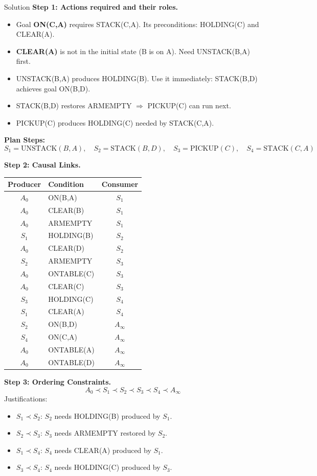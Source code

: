 \documentclass[12pt,a4paper]{article}
\begin{document}
\begin{solbox}{Solution}
\textbf{Step 1: Actions required and their roles.}

\begin{itemize}[noitemsep]
  \item Goal \textbf{ON(C,A)} requires STACK(C,A). Its preconditions: HOLDING(C) and CLEAR(A).
  \item \textbf{CLEAR(A)} is not in the initial state (B is on A). Need UNSTACK(B,A) first.
  \item UNSTACK(B,A) produces HOLDING(B). Use it immediately: STACK(B,D) achieves goal ON(B,D).
  \item STACK(B,D) restores ARMEMPTY $\Rightarrow$ PICKUP(C) can run next.
  \item PICKUP(C) produces HOLDING(C) needed by STACK(C,A).
\end{itemize}

\textbf{Plan Steps:}
\[
S_1 = \text{UNSTACK}(B,A),\quad S_2 = \text{STACK}(B,D),\quad
S_3 = \text{PICKUP}(C),\quad S_4 = \text{STACK}(C,A)
\]

\bigskip
\textbf{Step 2: Causal Links.}

\begin{center}
\begin{tabular}{clc}
\toprule
\textbf{Producer} & \textbf{Condition} & \textbf{Consumer} \\
\midrule
$A_0$ & ON(B,A) & $S_1$ \\
$A_0$ & CLEAR(B) & $S_1$ \\
$A_0$ & ARMEMPTY & $S_1$ \\
$S_1$ & HOLDING(B) & $S_2$ \\
$A_0$ & CLEAR(D) & $S_2$ \\
$S_2$ & ARMEMPTY & $S_3$ \\
$A_0$ & ONTABLE(C) & $S_3$ \\
$A_0$ & CLEAR(C) & $S_3$ \\
$S_3$ & HOLDING(C) & $S_4$ \\
$S_1$ & CLEAR(A) & $S_4$ \\
$S_2$ & ON(B,D) & $A_\infty$ \\
$S_4$ & ON(C,A) & $A_\infty$ \\
$A_0$ & ONTABLE(A) & $A_\infty$ \\
$A_0$ & ONTABLE(D) & $A_\infty$ \\
\bottomrule
\end{tabular}
\end{center}

\textbf{Step 3: Ordering Constraints.}
\[
A_0 \prec S_1 \prec S_2 \prec S_3 \prec S_4 \prec A_\infty
\]
Justifications:
\begin{itemize}[noitemsep]
  \item $S_1 \prec S_2$: $S_2$ needs HOLDING(B) produced by $S_1$.
  \item $S_2 \prec S_3$: $S_3$ needs ARMEMPTY restored by $S_2$.
  \item $S_1 \prec S_4$: $S_4$ needs CLEAR(A) produced by $S_1$.
  \item $S_3 \prec S_4$: $S_4$ needs HOLDING(C) produced by $S_3$.
\end{itemize}


\end{solbox}
\end{document}
